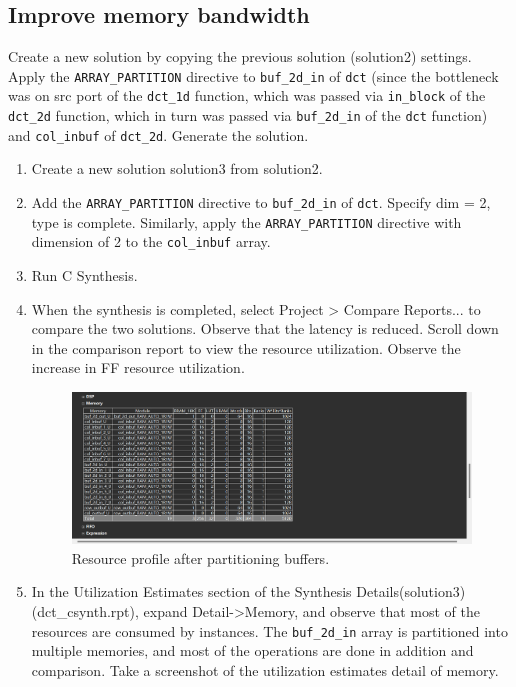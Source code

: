 \documentclass[a4paper,12pt,twoside]{article}
\begin{document}
\subsection{Improve memory bandwidth}\label{S35}
Create a new solution by copying the previous solution (solution2) settings. Apply the \texttt{ARRAY\_PARTITION} directive to \texttt{buf\_2d\_in} of \texttt{dct} (since the bottleneck was on src port of the \texttt{dct\_1d} function, which was passed via \texttt{in\_block} of the \texttt{dct\_2d} function, which in turn was passed via \texttt{buf\_2d\_in} of the \texttt{dct} function) and \texttt{col\_inbuf} of \texttt{dct\_2d}. Generate the solution.
\begin{enumerate}
    \item Create a new solution solution3 from solution2.
    \item Add the \texttt{ARRAY\_PARTITION} directive to \texttt{buf\_2d\_in} of \texttt{dct}. Specify dim = 2, type is complete. Similarly, apply the \texttt{ARRAY\_PARTITION} directive with dimension of 2 to the \texttt{col\_inbuf} array.
    \item Run C Synthesis.
    \item When the synthesis is completed, select Project > Compare Reports... to compare the two solutions. Observe that the latency is reduced. Scroll down in the comparison report to view the resource utilization. Observe the increase in FF resource utilization.
    \begin{figure}[H]
        \centering
        \includegraphics[width=\textwidth]{images/19.png}
        \caption{Resource profile after partitioning buffers.}
    \end{figure}
    \item In the Utilization Estimates section of the Synthesis Details(solution3)(dct\_csynth.rpt), expand Detail->Memory, and observe that most of the resources are consumed by instances. The \texttt{buf\_2d\_in} array is partitioned into multiple memories, and most of the operations are done in addition and comparison. Take a screenshot of the utilization estimates detail of memory.
\end{enumerate}
\end{document}

